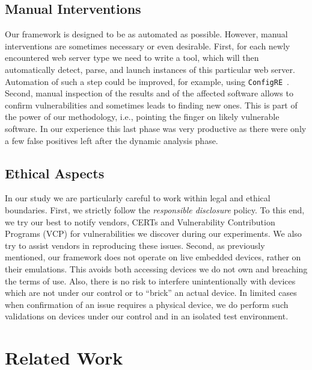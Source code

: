 \documentclass[conference]{./templates/ndss/IEEEtran}
\newcounter{t0d0_counter}
\newcounter{pr00f_counter}
\begin{document}
\subsection{Manual Interventions}
\label{sec:discus-manual}

Our framework is designed to be as automated as possible.  However,
manual interventions are sometimes necessary or even desirable.
    First, for each newly encountered web server type we need to write a
tool, which will then automatically detect, parse, and launch instances
of this particular web server. Automation of such a step could be
improved, for example, using \texttt{ConfigRE}~\cite{wang2008towards}.
    Second, manual inspection of the results and of the affected software
allows to confirm vulnerabilities and sometimes leads to finding new ones. This
is part of the power of our methodology, i.e., pointing the finger on likely
vulnerable software. In our experience this last phase was very
productive as there were only a few false positives left after the dynamic
analysis phase.












\subsection{Ethical Aspects}
\label{sec:discus-ethical}

In our study we are particularly careful to work within legal and ethical
boundaries. 
    First, we strictly follow the \emph{responsible disclosure} policy. 
To this end, we try our best to notify vendors, CERTs and 
Vulnerability Contribution Programs (VCP) for vulnerabilities 
we discover during our experiments. We also try to assist vendors in 
reproducing these issues. 
    Second, as previously mentioned, our framework does not operate on 
live embedded devices, rather on their emulations. 
This avoids both accessing devices we do not own and 
breaching the terms of use.  Also, there is no risk to interfere
unintentionally with devices which are not under our control or to
``brick'' an actual device. 
In limited cases when confirmation of an
issue requires a physical device, we do perform such validations on
devices under our control and in an isolated test environment. 




\section{Related Work}
\label{sec:related-work}
\end{document}
